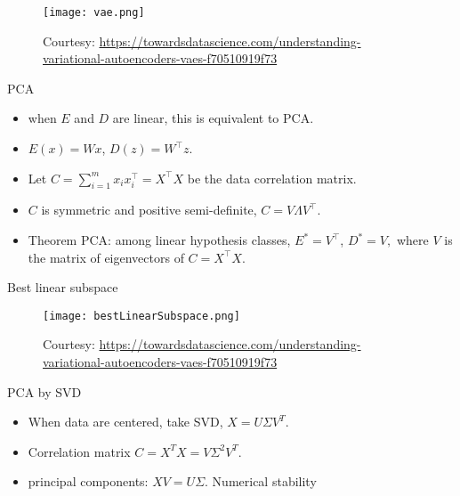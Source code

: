 \documentclass[final]{beamer}
\begin{document}
\begin{frame}
\begin{figure}
	\texttt{[image: vae.png]}
	\caption{Courtesy: \url{https://towardsdatascience.com/understanding-variational-autoencoders-vaes-f70510919f73}}
\end{figure}
\end{frame}
\begin{frame}{PCA}
	\begin{itemize}
	\item when $E$ and $D$ are linear, this is equivalent to PCA.
	\pause 
	\item $E(x) = Wx$, $D(z) = W^\top z$.
	\pause
	\item Let $C = \sum_{i=1}^m x_i x_i^\top = X^\top X$ be the data correlation matrix.
	\pause 
	\item $C$ is symmetric and positive semi-definite, $C = V \Lambda V^\top$.
	\item Theorem PCA: among linear hypothesis classes, $E^* = V^\top$, $D^* = V,$ where $V$ is the matrix of eigenvectors of $C = X^\top X$.
	\end{itemize}
\end{frame}
\begin{frame}{Best linear subspace}
	\begin{figure}
	\texttt{[image: bestLinearSubspace.png]}
	\caption{Courtesy: \url{https://towardsdatascience.com/understanding-variational-autoencoders-vaes-f70510919f73}}

	\end{figure}
\end{frame}
\begin{frame}{PCA by SVD}
	\begin{itemize}
		\item When data are centered, take SVD, $X = U \Sigma V^T$.
		\pause
		\item Correlation matrix $C =  X^T X = V \Sigma^2 V^T$.
		\pause
		\item principal components: $X V = U \Sigma$.
		\pause
		Numerical stability
	\end{itemize}
\end{frame}
\end{document}
